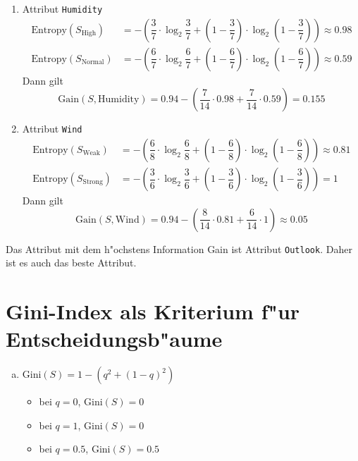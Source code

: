 \documentclass[10pt, oneside]{article}
\begin{document}
\begin{enumerate}[(a)]
\begin{enumerate}[1.]
           \item Attribut \verb|Humidity|
                \begin{align*}
                    \text{Entropy}(S_\text{High})   &= -\left(\dfrac{3}{7} \cdot \log_2 \dfrac{3}{7} + \left(1 - \dfrac{3}{7}\right) \cdot \log_2\left(1 - \dfrac{3}{7}\right)\right) \approx 0.98 \\[5pt]
                    \text{Entropy}(S_\text{Normal}) &= -\left(\dfrac{6}{7} \cdot \log_2 \dfrac{6}{7} + \left(1 - \dfrac{6}{7}\right) \cdot \log_2\left(1 - \dfrac{6}{7}\right)\right) \approx 0.59
                \end{align*}
                Dann gilt
                \begin{equation*}
                    \text{Gain}(S, \text{Humidity}) = 0.94 - \left(\dfrac{7}{14} \cdot 0.98 + \dfrac{7}{14} \cdot 0.59\right) = 0.155
                \end{equation*}

           \item Attribut \verb|Wind|
                \begin{align*}
                    \text{Entropy}(S_\text{Weak})   &= -\left(\dfrac{6}{8} \cdot \log_2 \dfrac{6}{8} + \left(1 - \dfrac{6}{8}\right) \cdot \log_2\left(1 - \dfrac{6}{8}\right)\right) \approx 0.81 \\[5pt]
                    \text{Entropy}(S_\text{Strong}) &= -\left(\dfrac{3}{6} \cdot \log_2 \dfrac{3}{6} + \left(1 - \dfrac{3}{6}\right) \cdot \log_2\left(1 - \dfrac{3}{6}\right)\right) = 1
                \end{align*}
                Dann gilt
                \begin{equation*}
                    \text{Gain}(S, \text{Wind}) = 0.94 - \left(\dfrac{8}{14} \cdot 0.81 + \dfrac{6}{14} \cdot 1\right) \approx 0.05
                \end{equation*}
        \end{enumerate}

        Das Attribut mit dem h"ochstens Information Gain ist Attribut
        \verb|Outlook|. Daher ist es auch das beste Attribut.
\end{enumerate}

\section{Gini-Index als Kriterium f"ur Entscheidungsb"aume}

\begin{enumerate}[(a)]
    \item $\text{Gini}(S) = 1 - (q^2 + (1 - q)^2)$
        \begin{itemize}
            \item bei $q = 0$, $\text{Gini}(S) = 0$
            \item bei $q = 1$, $\text{Gini}(S) = 0$
            \item bei $q = 0.5$, $\text{Gini}(S) = 0.5$
        \end{itemize}
\end{enumerate}
\end{document}

